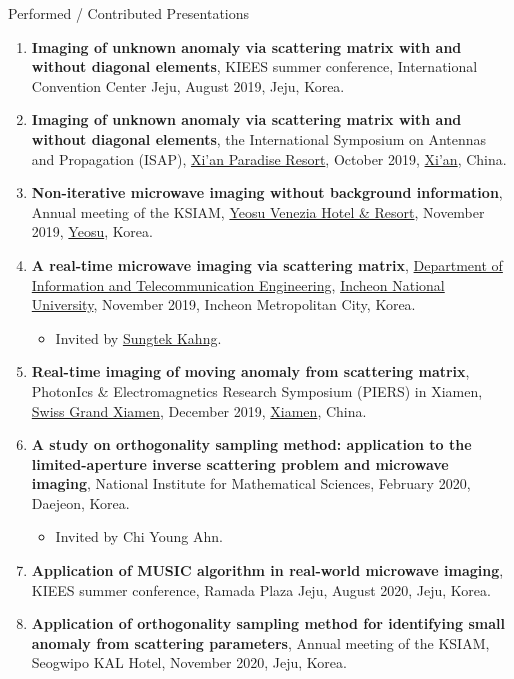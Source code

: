 \documentclass{resume} %
\begin{document}
\begin{rSection}{Performed / Contributed Presentations}
\begin{enumerate}
\item\label{P-KIEES2019B} \textbf{Imaging of unknown anomaly via scattering matrix with and without diagonal elements}, KIEES summer conference, International Convention Center Jeju, August 2019, Jeju, Korea.
\item\label{P-ISAP2019} \textbf{Imaging of unknown anomaly via scattering matrix with and without diagonal elements}, the  International Symposium on Antennas and Propagation (ISAP), \href{http://www.paradiseresortxian.com/}{Xi'an Paradise Resort}, October 2019, \href{http://www.xa.gov.cn/}{Xi'an}, China.
\item\label{P-KSIAM2019} \textbf{Non-iterative microwave imaging without background information}, Annual meeting of the KSIAM, \href{http://www.yeosuvenezia.com}{Yeosu Venezia Hotel \& Resort}, November 2019, \href{http://www.yeosu.go.kr}{Yeosu}, Korea.
\item\label{P-INU2019} \textbf{A real-time microwave imaging via scattering matrix}, \href{http://ite.inu.ac.kr/user/indexMain.do?siteId=ite_eng}{Department of Information and Telecommunication Engineering}, \href{http://www.inu.ac.kr/mbshome/mbs/inuengl/index.html}{Incheon National University}, November 2019, Incheon Metropolitan City, Korea.
\begin{itemize}
\item Invited by \href{https://sites.google.com/site/miemiincheonnationaluniversity/}{Sungtek Kahng}.
\end{itemize}
\item\label{P-PIERS2019C} \textbf{Real-time imaging of moving anomaly from scattering matrix}, PhotonIcs \& Electromagnetics Research Symposium (PIERS) in Xiamen, \href{http://www.swissgrandxiamen.com.cn/en}{Swiss Grand Xiamen}, December 2019, \href{http://english.xm.gov.cn}{Xiamen}, China.
\item\label{P-NIMS2020} \textbf{A study on orthogonality sampling method: application to the limited-aperture inverse scattering problem and microwave imaging}, National Institute for Mathematical Sciences, February 2020, Daejeon, Korea.
    \begin{itemize}
\item Invited by Chi Young Ahn.
\end{itemize}
\item\label{P-KIEES2020A} \textbf{Application of MUSIC algorithm in real-world microwave imaging}, KIEES summer conference, Ramada Plaza Jeju, August 2020, Jeju, Korea.
\item\label{P-KSIAM2020} \textbf{Application of orthogonality sampling method for identifying small anomaly from scattering parameters}, Annual meeting of the KSIAM, Seogwipo KAL Hotel, November 2020, Jeju, Korea.

\end{enumerate}
\end{rSection}
\end{document}
